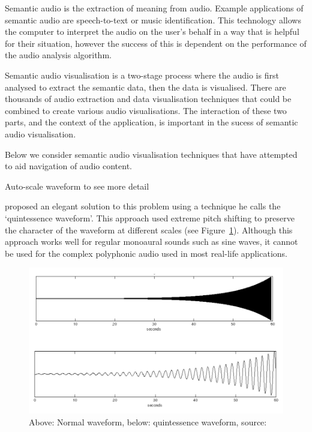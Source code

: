 Semantic audio is the extraction of meaning from audio. Example applications of semantic audio are speech-to-text or
music identification. This technology allows the computer to interpret the audio on the user's behalf in a way that is
helpful for their situation, however the success of this is dependent on the performance of the audio analysis
algorithm.

Semantic audio visualisation is a two-stage process where the audio is first analysed to extract the semantic data,
then the data is visualised. There are thousands of audio extraction and data visualisation techniques that could
be combined to create various audio visualisations. The interaction of these two parts, and the context of the
application, is important in the sucess of semantic audio visualisation. 

Below we consider semantic audio visualisation techniques that have attempted to aid navigation of audio content.

Auto-scale waveform to see more detail \citep{Goudeseune2012}

\citet{Loviscach2011}
proposed an elegant solution to this problem using a technique he calls the `quintessence waveform'. This approach
used extreme pitch shifting to preserve the character of the waveform at different scales (see Figure~\ref{fig:quint}).
Although this approach works well for regular monoaural sounds such as sine waves, it cannot be used for the complex
polyphonic audio used in most real-life applications.

\begin{figure}[p]
  \centering
  \includegraphics[width=0.95\linewidth]{figs/quint.png}
  \caption{Above: Normal waveform, below: quintessence waveform, source: \citep{Loviscach2011}}
  \label{fig:quint}
\end{figure}

